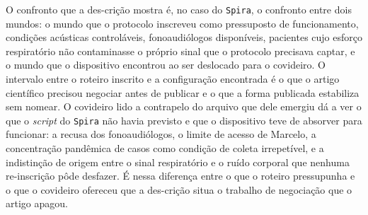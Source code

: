 O confronto que a des-crição mostra é, no caso do \texttt{Spira}, o confronto entre dois mundos: o mundo que o protocolo inscreveu como pressuposto de funcionamento, condições acústicas controláveis, fonoaudiólogos disponíveis, pacientes cujo esforço respiratório não contaminasse o próprio sinal que o protocolo precisava captar, e o mundo que o dispositivo encontrou ao ser deslocado para o covideiro. O intervalo entre o roteiro inscrito e a configuração encontrada é o que o artigo científico precisou negociar antes de publicar e o que a forma publicada estabiliza sem nomear. O covideiro lido a contrapelo do arquivo que dele emergiu dá a ver o que o \textit{script} do \texttt{Spira} não havia previsto e que o dispositivo teve de absorver para funcionar: a recusa dos fonoaudiólogos, o limite de acesso de Marcelo, a concentração pandêmica de casos como condição de coleta irrepetível, e a indistinção de origem entre o sinal respiratório e o ruído corporal que nenhuma re-inscrição pôde desfazer. É nessa diferença entre o que o roteiro pressupunha e o que o covideiro ofereceu que a des-crição situa o trabalho de negociação que o artigo apagou.

